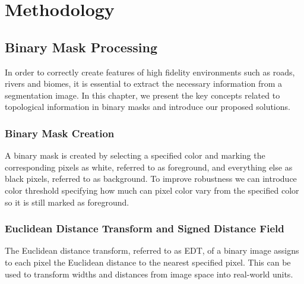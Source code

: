\chapter{Methodology}


\section{Binary Mask Processing}


In order to correctly create features of high fidelity environments such as roads, rivers and biomes, it is essential to extract the necessary information from a segmentation image. In this chapter, we present the key concepts related to topological information in binary masks and introduce our proposed solutions.

\subsection{Binary Mask Creation}

A binary mask is created by selecting a specified color and marking the corresponding pixels as white, referred to as foreground, and everything else as black pixels, referred to as background. To improve robustness we can introduce color threshold specifying how much can pixel color vary from the specified color so it is still marked as foreground.



\subsection{Euclidean Distance Transform and Signed Distance Field}

The Euclidean distance transform, referred to as EDT, of a binary image assigns to each pixel the Euclidean distance to the nearest specified pixel. This can be used to transform widths and distances from image space into real-world units.

